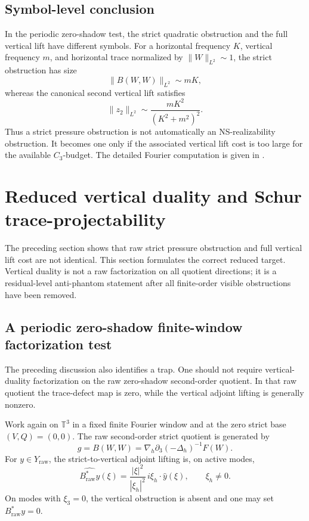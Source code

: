 \documentclass[11pt]{article}
\numberwithin{equation}{section}
\begin{document}
\subsection{Symbol-level conclusion}
In the periodic zero-shadow test, the strict quadratic obstruction and the full vertical lift have different symbols. For a horizontal frequency \(K\), vertical frequency \(m\), and horizontal trace normalized by \(\|W\|_{L^2}\sim1\), the strict obstruction has size
\[
  \|B(W,W)\|_{L^2}\sim mK,
\]
whereas the canonical second vertical lift satisfies
\[
  \|z_2\|_{L^2}\sim \frac{mK^2}{(K^2+m^2)^2}.
\]
Thus a strict pressure obstruction is not automatically an NS-realizability obstruction. It becomes one only if the associated vertical lift cost is too large for the available \(C_3\)-budget. The detailed Fourier computation is given in .



\section{Reduced vertical duality and Schur trace-projectability}

The preceding section shows that raw strict pressure obstruction and full vertical lift cost are not identical. This section formulates the correct reduced target. Vertical duality is not a raw factorization on all quotient directions; it is a residual-level anti-phantom statement after all finite-order visible obstructions have been removed.

\subsection{A periodic zero-shadow finite-window factorization test}\label{subsec:raw-factorization-obstruction}

The preceding discussion also identifies a trap.  One should not require vertical-duality factorization on the raw zero-shadow second-order quotient.  In that raw quotient the trace-defect map is zero, while the vertical adjoint lifting is generally nonzero.

Work again on \(\mathbb T^3\) in a fixed finite Fourier window and at the zero strict base \((V,Q)=(0,0)\).  The raw second-order strict quotient is generated by
\[
g=B(W,W)=\nabla_h\partial_3(-\Delta_h)^{-1}F(W).
\]
For \(y\in Y_{\mathrm{raw}}\), the strict-to-vertical adjoint lifting is, on active modes,
\begin{equation}\label{eq:Browsymbol}
\widehat{B_{\mathrm{raw}}^*y}(\xi)
=
\frac{|\xi|^2}{|\xi_h|^2}
\,i\xi_h\cdot\widehat y(\xi),
\qquad
\xi_h\ne0.
\end{equation}
On modes with \(\xi_3=0\), the vertical obstruction is absent and one may set \(B_{\mathrm{raw}}^*y=0\).
\end{document}
